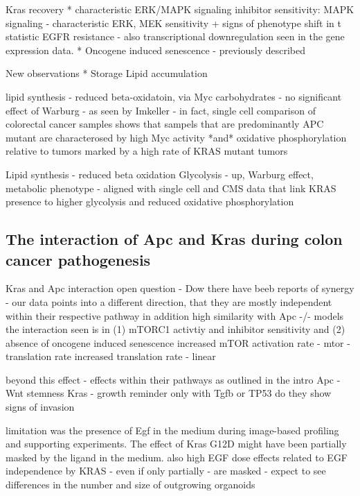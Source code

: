 \begin{flushleft}
Kras recovery
* characteristic ERK/MAPK signaling inhibitor sensitivity:
MAPK signaling - characteristic ERK, MEK sensitivity + signs of phenotype shift in t statistic
EGFR resistance - also transcriptional downregulation seen in the gene expression data.
* Oncogene induced senescence - previously described
\par


New observations 
* Storage Lipid accumulation

lipid synthesis - reduced beta-oxidatoin, via Myc
carbohydrates - no significant effect of Warburg - as seen by Imkeller  - in fact, single cell comparison of colorectal cancer samples shows that sampels that are predominantly APC mutant are characterosed by high Myc activity *and* oxidative phosphorylation relative to tumors marked by a high rate of KRAS mutant tumors

Lipid synthesis - reduced beta oxidation
Glycolysis - up, Warburg effect, metabolic phenotype - aligned with single cell and CMS data that link KRAS presence to higher glycolysis and reduced oxidative phosphorylation 


\subsection{The interaction of Apc and Kras during colon cancer pathogenesis}
Kras and Apc interaction open question - Dow
there have beeb reports of synergy \citep{luoMutatedRasAsp122009} - our data points into a different direction, that they are mostly independent within their respective pathway 
in addition high similarity with Apc -/- models
the interaction seen is in (1) mTORC1 activtiy and inhibitor sensitivity and (2) absence of oncogene induced senescence 
increased mTOR activation rate - mtor - translation rate
increased translation rate \citep{smitDriverMutationsAdenomacarcinoma2020a} - linear

beyond this effect - effects within their pathways
as outlined in the intro 
Apc - Wnt stemness 
Kras - growth
reminder only with Tgfb or TP53 do they show signs of invasion
\par

limitation was the presence of Egf in the medium during image-based profiling and supporting experiments. The effect of Kras G12D might have been partially masked by the ligand in the medium. 
also high EGF dose
effects related to EGF independence by KRAS - even if only partially - are masked - 
expect to see differences in the number and size of outgrowing organoids



\end{flushleft}
